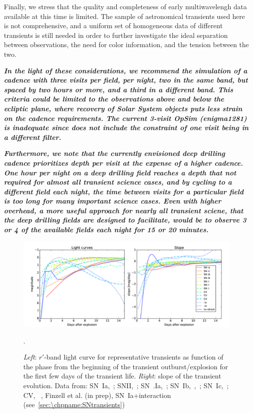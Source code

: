 Finally, we stress that the quality and completeness of early
multiwavelengh data available at this time is limited. The sample of
astronomical transients used here is not comprehensive, and a uniform
set of homogeneous data of different transients is still needed in
order to further investigate the ideal separation between
observations, the need for color information, and the tension between
the two.

{\bf\emph{In the light of these considerations, we recommend the
    simulation of a cadence with three visits per field, per night,
    two in the same band, but spaced by two hours or more, and a third
    in a different band. This criteria could be limited to the
    observations above and below the ecliptic plane, where recovery of
    Solar System objects puts less strain on the cadence requirements.
    The current 3-visit OpSim (enigma1281) is inadequate since does not
    include the constraint of one visit being in a different filter.}}

{\bf\emph{Furthermore, we note that the currently envisioned
    deep drilling cadence prioritizes depth per visit at the expense
    of a higher cadence. One hour per night on a deep drilling field
    reaches a depth that not required for almost all transient science
    cases, and by cycling to a different field each night, the time
    between visits for a particular field is too long for many
    important science cases. Even with higher overhead, a more useful
    approach for nearly all transient sciene, that the deep drilling
    fields are designed to facilitate, would be to observe 3 or 4 of
    the available fields each night for 15 or 20 minutes.}}

\begin{figure}[hbt]
\centerline{
\includegraphics[width=\textwidth]{figs/transients/earlyslope1.pdf}
}
\caption{\emph{Left}: $r'$-band light curve for representative transients as function of the phase from the beginning of the transient outburst/explosion for the first few days of the transient life. \emph{Right}: slope of the transient evolution. Data from: SN~Ia,~\citet{Olling15}; SNII,~\citet{Rubin16}; SN~.Ia,~\citet{Shen10}; SN~Ib,~\citet{Valenti11},~\citet{Cao13}; SN~Ic,~\citet{Mazzali02}; CV, ~\citet{Sokoloski13}, Finzell et al. (in prep), SN~Ia+interaction (see~\autoref{sec:\chpname:SNtransients})}.
\label{fig:earlyslope}
\end{figure}

